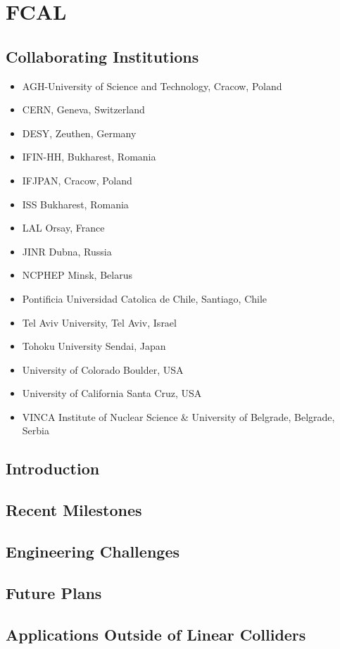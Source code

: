 \section{FCAL}
\subsection{Collaborating Institutions}
\begin{itemize}
	\item AGH-University of Science and Technology, Cracow, Poland
	\item CERN, Geneva, Switzerland 
	\item DESY, Zeuthen, Germany 
	\item IFIN-HH, Bukharest, Romania 
	\item IFJPAN, Cracow, Poland 
	\item ISS Bukharest, Romania 
	\item LAL Orsay, France 
	\item JINR Dubna, Russia 
	\item NCPHEP Minsk, Belarus 
	\item Pontificia Universidad Catolica de Chile, Santiago, Chile
	\item Tel Aviv University, Tel Aviv, Israel 
	\item Tohoku University Sendai, Japan 
	\item University of Colorado Boulder, USA 
	\item University of California Santa Cruz, USA 
	\item VINCA Institute of Nuclear Science \& University of Belgrade, Belgrade, Serbia
\end{itemize}
\subsection{Introduction}
\subsection{Recent Milestones}
\subsection{Engineering Challenges}
\subsection{Future Plans}
\subsection{Applications Outside of Linear Colliders}


